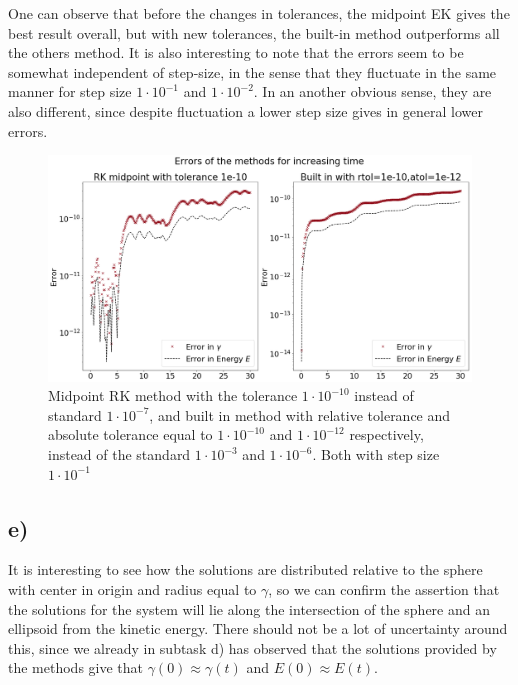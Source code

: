 \documentclass[12pt, a4paper,usenames,dvipsnames]{article}
\begin{document}
One can observe that before the changes in tolerances, the midpoint EK gives the best result overall, but with new tolerances, the built-in method outperforms all the others method. It is also interesting to note that the errors seem to be somewhat independent of step-size, in the sense that they fluctuate in the same manner for step size \(1\cdot10^{-1}\) and \(1\cdot10^{-2}\). In an another obvious sense, they are also different, since despite fluctuation a lower step size gives in general lower errors.
\begin{figure}
    \centering
    \includegraphics[width=0.7\linewidth]{graph2d2.png}
    \caption{Midpoint RK method with the tolerance \(1\cdot10^{-10}\) instead of standard \(1\cdot10^{-7}\), and built in method with relative tolerance and absolute tolerance equal to \(1\cdot10^{-10}\) and \(1\cdot10^{-12}\) respectively, instead of the standard \(1\cdot10^{-3}\) and \(1\cdot10^{-6}\). Both with step size \(1\cdot10^{-1}\)}
    \label{fig:gr2d2}
\end{figure}
\subsection*{e)}
It is interesting to see how the solutions are distributed relative to the sphere with center in origin and radius equal to \(\gamma\), so we can confirm the assertion that the solutions for the system will lie along the intersection of the sphere and an ellipsoid from the kinetic energy. There should not be a lot of uncertainty around this, since we already in subtask d) has observed that the solutions provided by the methods give that \(\gamma(0)\approx\gamma(t)\) and \(E(0)\approx E(t)\). 
\end{document}
